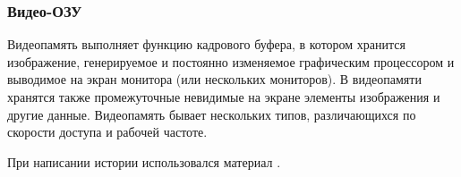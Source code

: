 \subsubsection{Видео-ОЗУ}

Видеопамять выполняет функцию кадрового буфера, в котором хранится изображение, генерируемое и постоянно изменяемое графическим процессором и выводимое на экран монитора (или нескольких мониторов). В видеопамяти хранятся также промежуточные невидимые на экране элементы изображения и другие данные. Видеопамять бывает нескольких типов, различающихся по скорости доступа и рабочей частоте.

При написании истории использовался материал \cite{hist1}.
